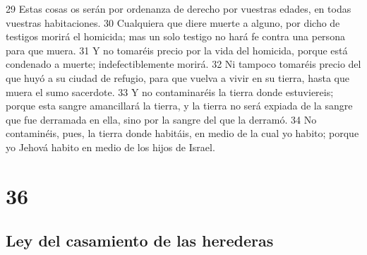29 Estas cosas os serán por ordenanza de derecho por vuestras edades, en todas vuestras habitaciones.
30 Cualquiera que diere muerte a alguno, por dicho de testigos morirá el homicida; mas un solo testigo no hará fe contra una persona para que muera.
31 Y no tomaréis precio por la vida del homicida, porque está condenado a muerte; indefectiblemente morirá.
32 Ni tampoco tomaréis precio del que huyó a su ciudad de refugio, para que vuelva a vivir en su tierra, hasta que muera el sumo sacerdote.
33 Y no contaminaréis la tierra donde estuviereis; porque esta sangre amancillará la tierra, y la tierra no será expiada de la sangre que fue derramada en ella, sino por la sangre del que la derramó.
34 No contaminéis, pues, la tierra donde habitáis, en medio de la cual yo habito; porque yo Jehová habito en medio de los hijos de Israel.

\chapter{36}

\section*{Ley del casamiento de las herederas}


